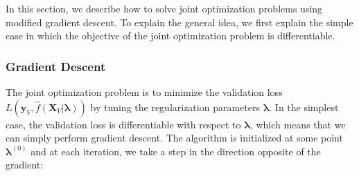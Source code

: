 \documentclass[10pt,letterpaper]{article}
\begin{document}
In this section, we describe how to solve joint optimization problems using modified gradient descent. To explain the general idea, we first explain the simple case in which the objective of the joint optimization problem is differentiable.


\subsubsection{Gradient Descent}

The joint optimization problem is to minimize the validation loss $L(\boldsymbol{y}_V, \hat f(\boldsymbol{X}_V | \boldsymbol{\lambda}))$ by tuning the regularization parameters $\boldsymbol{\lambda}$. In the simplest case, the validation loss is differentiable with respect to $\boldsymbol{\lambda}$, which means that we can simply perform gradient descent. The algorithm is initialized at some point $\boldsymbol{\lambda}^{(0)}$ and at each iteration, we take a step in the direction opposite of the gradient:
\end{document}
